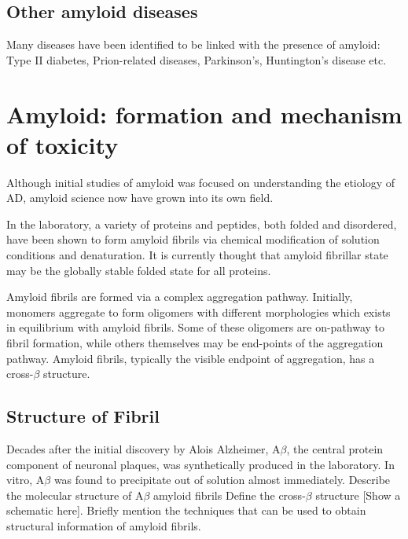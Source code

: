 \subsection{Other amyloid diseases}
Many diseases have been identified to be linked with the presence of amyloid: Type II diabetes, Prion-related diseases, Parkinson's, Huntington's disease etc.


\section{Amyloid: formation and mechanism of toxicity}
  \begin{outline}[enumerate]
    \1 Although initial studies of amyloid was focused on understanding the etiology of AD, amyloid science now have grown into its own field.

    \1 In the laboratory, a variety of proteins and peptides, both folded and disordered, have been shown to form amyloid fibrils via chemical modification of solution conditions and denaturation. It is currently thought that amyloid fibrillar state may be the globally stable folded state for all proteins.

    \1 Amyloid fibrils are formed via a complex aggregation pathway. Initially, monomers aggregate to form oligomers with different morphologies which exists in equilibrium with amyloid fibrils. Some of these oligomers are on-pathway to fibril formation, while others themselves may be end-points of the aggregation pathway. Amyloid fibrils, typically the visible endpoint of aggregation, has a cross-$\beta$ structure.
  \end{outline}

 \subsection{Structure of Fibril}
   \begin{outline}
    \1 Decades after the initial discovery by Alois Alzheimer, A$\beta$, the central protein component of neuronal plaques, was synthetically produced in the laboratory. In vitro, A$\beta$ was found to precipitate out of solution almost immediately. 
  		\2 Describe the molecular structure of A$\beta$ amyloid fibrils
  			\3 Define the cross-$\beta$ structure [Show a schematic here].
  		\2 Briefly mention the techniques that can be used to obtain structural information of amyloid fibrils.
		\end{outline}

